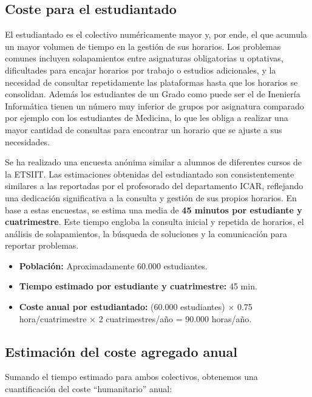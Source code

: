 \subsection{Coste para el estudiantado}

El estudiantado es el colectivo numéricamente mayor y, por ende, el que acumula un mayor volumen de tiempo en la gestión de sus horarios. Los problemas comunes incluyen solapamientos entre asignaturas obligatorias u optativas, dificultades para encajar horarios por trabajo o estudios adicionales, y la necesidad de consultar repetidamente las plataformas hasta que los horarios se consolidan. Además los estudiantes de un Grado como puede ser el de Ineniería Informática tienen un número muy inferior de grupos por asignatura comparado por ejemplo con los estudiantes de Medicina, lo que les obliga a realizar una mayor cantidad de consultas para encontrar un horario que se ajuste a sus necesidades.\newline

Se ha realizado una encuesta anónima similar a alumnos de diferentes cursos de la ETSIIT. Las estimaciones obtenidas del estudiantado son consistentemente similares a las reportadas por el profesorado del departamento ICAR, reflejando una dedicación significativa a la consulta y gestión de sus propios horarios. En base a estas encuestas, se estima una media de \textbf{45 minutos por estudiante y cuatrimestre}. Este tiempo engloba la consulta inicial y repetida de horarios, el análisis de solapamientos, la búsqueda de soluciones y la comunicación para reportar problemas.

\begin{itemize}
    \item \textbf{Población:} Aproximadamente 60.000 estudiantes.
    \item \textbf{Tiempo estimado por estudiante y cuatrimestre:} 45 min.
    \item \textbf{Coste anual por estudiantado:} (60.000 estudiantes) $\times$ 0.75 hora/cuatrimestre $\times$ 2 cuatrimestres/año = 90.000 horas/año.
\end{itemize}

\subsection{Estimación del coste agregado anual}

Sumando el tiempo estimado para ambos colectivos, obtenemos una cuantificación del coste ``humanitario'' anual:

